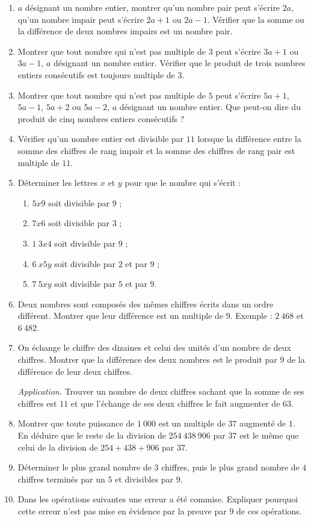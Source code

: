 \documentclass[12 pt]{report}
\theoremstyle{plain}
\newcounter{n}
\begin{document}
\begin{enumerate}
\item  $a$ désignant un nombre entier, montrer qu'un nombre pair peut s'écrire $2a$, qu'un nombre impair peut s'écrire $2a+1$ ou $2a-1$. Vérifier que la somme ou la différence de deux nombres impairs est un nombre pair.  
\item Montrer que tout nombre qui n'est pas multiple de $3$ peut s'écrire $3a+1$ ou $3a-1$, $a$ désignant un nombre entier.
Vérifier que le produit de trois nombres entiers consécutifs est toujours multiple de $3$. 
\item Montrer que tout nombre qui n'est pas multiple de $5$ peut s'écrire $5a+1$, $5a-1$, $5a+2$ ou $5a-2$, $a$ désignant un nombre entier. Que peut-on dire du produit de cinq nombres entiers consécutifs ? 
\item Vérifier qu'un nombre entier est divisible par $11$ lorsque la différence entre la somme des chiffres
de rang impair et la somme des chiffres de rang pair 
est multiple de $11$. 
\item Déterminer les lettres $x$ et $y$ pour que le nombre qui s'écrit : 
\begin{enumerate}
\item $5x9$ soit divisible par $9$ ; 
\item $7x6$ soit divisible par $3$ ; 
\item $1~3x4$ soit divisible par $9$ ; 
\item $6~x5y$ soit divisible par $2$ et par $9$ ; 
\item $7~5xy$ soit divisible par $5$ et par $9$. 
\end{enumerate}
\item Deux nombres sont composés des mêmes chiffres écrits dans un ordre différent. Montrer que leur différence est un multiple de $9$. Exemple : $2~468$
et $6~482$. 
\item On échange le chiffre des dizaines et celui des unités d'un nombre de deux chiffres. Montrer que la différence des deux nombres est le produit par $9$
de la différence de leur deux chiffres. 

\emph{Application.} Trouver un nombre de deux chiffres sachant que la somme de ses chiffres est $11$ et que l'échange de ses deux chiffres le fait augmenter de $63$. 
\item Montrer que toute puissance de $1~000$ est un 
multiple de $37$ augmenté de $1$. En déduire que le reste de la division de $254~438~906$ par $37$ est le même que celui de la division de $254+438+906$ par $37$. 
\item Déterminer le plus grand nombre de $3$ chiffres, puis le plus grand nombre de $4$ chiffres terminés par 
un $5$ et divisibles par $9$. 
\item Dans les opérations suivantes une erreur a été
commise. Expliquer pourquoi cette erreur n'est pas 
mise en évidence par la preuve par $9$ de ces opérations.


\end{enumerate}
\end{document}
